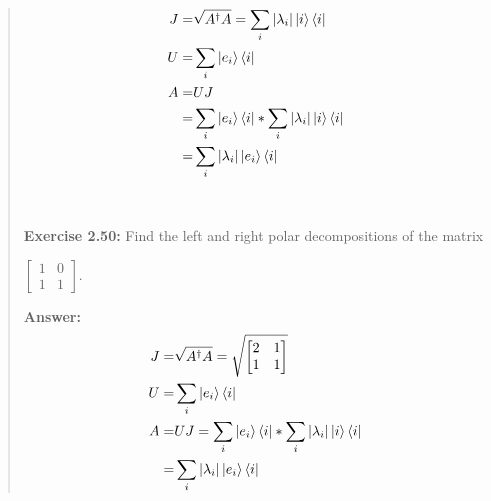 \documentclass[UTF8]{ctexart}
\begin{document}
\begin{quote}
\begin{equation}
	\begin{aligned}
J=&\sqrt{A^{\dagger}A}=\sum_{i}|\lambda_{i}|\ket{i}\bra{i}\\
U=&\sum_{i}\ket{e_{i}}\bra{i}\\
A=&UJ\\
 =&\sum_{i}\ket{e_{i}}\bra{i}*\sum_{i}|\lambda_{i}|\ket{i}\bra{i}\\
 =&\sum_{i}|\lambda_{i}|\ket{e_{i}}\bra{i}
	\end{aligned}
	\end{equation}
\\
\\
\textbf{Exercise 2.50: }  Find the left and right polar decompositions of the matrix
\begin{center}
$\begin{bmatrix}1& 0\\1& 1\end{bmatrix}$.
\end{center}

\textbf{Answer:}	 \\
\begin{equation}
	\begin{aligned}
J=&\sqrt{A^{\dagger}A}=\sqrt{\begin{bmatrix}2& 1\\1& 1\end{bmatrix}}\\
U=&\sum_{i}\ket{e_{i}}\bra{i}\\
A=&UJ=\sum_{i}\ket{e_{i}}\bra{i}*\sum_{i}|\lambda_{i}|\ket{i}\bra{i}\\
 =&\sum_{i}|\lambda_{i}|\ket{e_{i}}\bra{i}
	\end{aligned}
	\end{equation}



\end{quote}
\end{document}
